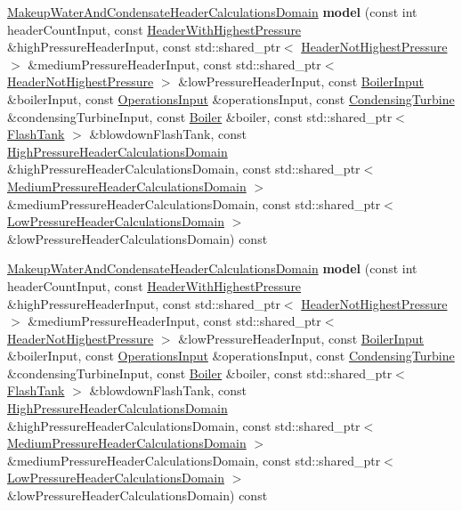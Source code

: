 \begin{DoxyCompactItemize}
\hyperlink{class_makeup_water_and_condensate_header_calculations_domain}{Makeup\+Water\+And\+Condensate\+Header\+Calculations\+Domain} {\bfseries model} (const int header\+Count\+Input, const \hyperlink{class_header_with_highest_pressure}{Header\+With\+Highest\+Pressure} \&high\+Pressure\+Header\+Input, const std\+::shared\+\_\+ptr$<$ \hyperlink{class_header_not_highest_pressure}{Header\+Not\+Highest\+Pressure} $>$ \&medium\+Pressure\+Header\+Input, const std\+::shared\+\_\+ptr$<$ \hyperlink{class_header_not_highest_pressure}{Header\+Not\+Highest\+Pressure} $>$ \&low\+Pressure\+Header\+Input, const \hyperlink{class_boiler_input}{Boiler\+Input} \&boiler\+Input, const \hyperlink{class_operations_input}{Operations\+Input} \&operations\+Input, const \hyperlink{class_condensing_turbine}{Condensing\+Turbine} \&condensing\+Turbine\+Input, const \hyperlink{class_boiler}{Boiler} \&boiler, const std\+::shared\+\_\+ptr$<$ \hyperlink{class_flash_tank}{Flash\+Tank} $>$ \&blowdown\+Flash\+Tank, const \hyperlink{class_high_pressure_header_calculations_domain}{High\+Pressure\+Header\+Calculations\+Domain} \&high\+Pressure\+Header\+Calculations\+Domain, const std\+::shared\+\_\+ptr$<$ \hyperlink{class_medium_pressure_header_calculations_domain}{Medium\+Pressure\+Header\+Calculations\+Domain} $>$ \&medium\+Pressure\+Header\+Calculations\+Domain, const std\+::shared\+\_\+ptr$<$ \hyperlink{class_low_pressure_header_calculations_domain}{Low\+Pressure\+Header\+Calculations\+Domain} $>$ \&low\+Pressure\+Header\+Calculations\+Domain) const
\item 
\mbox{\label{class_makeup_water_and_condensate_header_modeler_a6f3618f3c520f3331ef9706918ed3a68}} 
\hyperlink{class_makeup_water_and_condensate_header_calculations_domain}{Makeup\+Water\+And\+Condensate\+Header\+Calculations\+Domain} {\bfseries model} (const int header\+Count\+Input, const \hyperlink{class_header_with_highest_pressure}{Header\+With\+Highest\+Pressure} \&high\+Pressure\+Header\+Input, const std\+::shared\+\_\+ptr$<$ \hyperlink{class_header_not_highest_pressure}{Header\+Not\+Highest\+Pressure} $>$ \&medium\+Pressure\+Header\+Input, const std\+::shared\+\_\+ptr$<$ \hyperlink{class_header_not_highest_pressure}{Header\+Not\+Highest\+Pressure} $>$ \&low\+Pressure\+Header\+Input, const \hyperlink{class_boiler_input}{Boiler\+Input} \&boiler\+Input, const \hyperlink{class_operations_input}{Operations\+Input} \&operations\+Input, const \hyperlink{class_condensing_turbine}{Condensing\+Turbine} \&condensing\+Turbine\+Input, const \hyperlink{class_boiler}{Boiler} \&boiler, const std\+::shared\+\_\+ptr$<$ \hyperlink{class_flash_tank}{Flash\+Tank} $>$ \&blowdown\+Flash\+Tank, const \hyperlink{class_high_pressure_header_calculations_domain}{High\+Pressure\+Header\+Calculations\+Domain} \&high\+Pressure\+Header\+Calculations\+Domain, const std\+::shared\+\_\+ptr$<$ \hyperlink{class_medium_pressure_header_calculations_domain}{Medium\+Pressure\+Header\+Calculations\+Domain} $>$ \&medium\+Pressure\+Header\+Calculations\+Domain, const std\+::shared\+\_\+ptr$<$ \hyperlink{class_low_pressure_header_calculations_domain}{Low\+Pressure\+Header\+Calculations\+Domain} $>$ \&low\+Pressure\+Header\+Calculations\+Domain) const

\end{DoxyCompactItemize}
